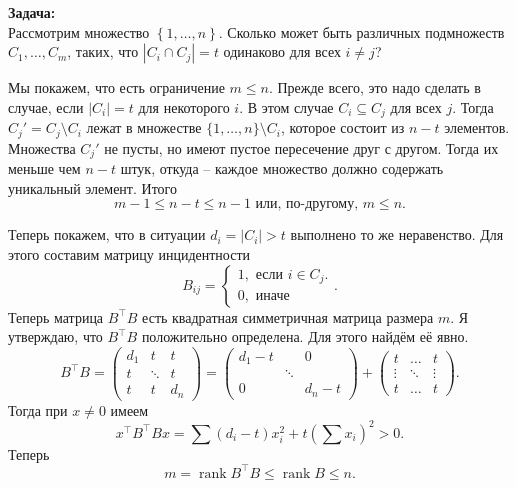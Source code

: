 \documentclass[10pt,a4paper,oneside]{book} %
\theoremstyle{definition}
\newcommand{\rank}{\operatorname{rank}}
\def\pmat{\begin{pmatrix}}
\def\epmat{\end{pmatrix}}
\begin{document}
{\bf Задача:}\\ Рассмотрим множество $\left\{ 1,\dots, n\right\}$. Сколько может быть различных подмножеств $C_1,\dots,C_m$, таких, что $|C_i \cap C_j|=t$ одинаково для всех $i \neq j$?

Мы покажем, что есть ограничение $m\leq n$. Прежде всего, это надо сделать в случае, если $|C_i|=t$ для некоторого $i$. В этом случае $C_i \subseteq C_j$ для всех $j$. Тогда $C_j'=C_j\setminus C_i$ лежат в множестве $\{1,\dots,n\}\setminus C_i$, которое состоит из $n-t$ элементов. Множества $C_j'$ не пусты, но имеют пустое пересечение друг с другом. Тогда их меньше чем $n-t$ штук, откуда -- каждое множество должно содержать уникальный элемент. Итого
$$m-1\leq n-t \leq n-1 \text{ или, по-другому, } m \leq n.$$

Теперь покажем, что в ситуации $d_i=|C_i|>t$ выполнено то же неравенство. Для этого составим матрицу инцидентности
$$B_{ij}= \begin{cases} 1, \text{ если } i\in C_j. \\
0, \text{ иначе}
\end{cases}. $$
Теперь матрица $B^{\top}B$ есть квадратная симметричная матрица размера $m$. Я утверждаю, что $B^{\top}B$ положительно определена. Для этого найдём её явно.
$$B^{\top}B= \pmat
d_1 & t &t\\ 
t & \ddots & t \\
t & t & d_n
\epmat = \pmat
d_1-t &  &0\\ 
 & \ddots &  \\
0 &  & d_n-t
\epmat + \pmat
t & \dots & t\\ 
\vdots & \ddots & \vdots \\
t & \dots & t
\epmat.$$
Тогда при $x\neq 0$ имеем 
$$x^{\top} B^{\top}B x = \sum (d_i-t) x_i^2 + t(\sum x_i)^2>0.$$
Теперь 
$$m=\rank B^{\top}B \leq \rank B \leq n.$$ 
\end{document}
